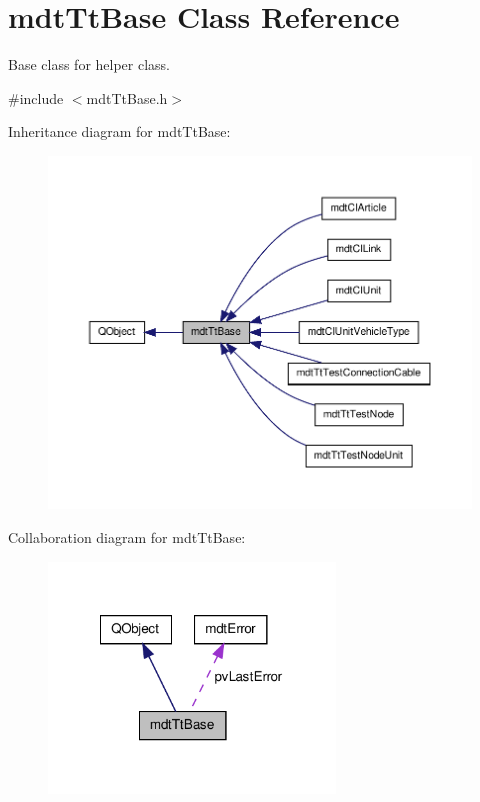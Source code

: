 \hypertarget{classmdt_tt_base}{\section{mdt\-Tt\-Base Class Reference}
\label{classmdt_tt_base}
}


Base class for helper class.  




{\ttfamily \#include $<$mdt\-Tt\-Base.\-h$>$}



Inheritance diagram for mdt\-Tt\-Base\-:
\nopagebreak
\begin{figure}[H]
\begin{center}
\leavevmode
\includegraphics[width=350pt]{classmdt_tt_base__inherit__graph}
\end{center}
\end{figure}


Collaboration diagram for mdt\-Tt\-Base\-:\nopagebreak
\begin{figure}[H]
\begin{center}
\leavevmode
\includegraphics[width=216pt]{classmdt_tt_base__coll__graph}
\end{center}
\end{figure}
